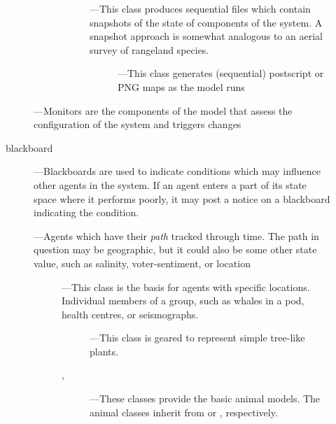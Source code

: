 \begin{description}
\begin{description}
\begin{description}
\begin{description}
      \item[]---This class produces sequential files
        which contain snapshots of the state of components of the
        system.  A snapshot approach is somewhat analogous to an
        aerial survey of rangeland species.
        
        \begin{description}
        \item[]---This class generates (sequential)
          postscript or PNG maps as the model runs
        \end{description}
      \end{description}
    \end{description}

  \item[\TTC{monitor}]---Monitors are the components of the
    model that assess the configuration of the system and
    triggers changes

  \item[blackboard]---Blackboards are used to indicate
    conditions which may influence other agents in the system.
    If an agent enters a part of its state space where it
    performs poorly, it may post a notice on a blackboard
    indicating the condition.

  \item[\TTC{tracked-agent}]---Agents which have their
    \emph{path} tracked through time.  The path in question may
    be geographic, but it could also be some other state
    value, such as salinity, voter-sentiment, or location

    \begin{description}
    \item[]---This class is the basis for agents with
      specific locations. Individual members of a group, such as
      whales in a pod, health centres, or seismographs.
      
      \begin{description}
      \item[]---This class is geared to
        represent simple tree-like plants.

      \item[, ]---These classes
        provide the basic animal models.  The animal classes
        inherit from  or ,
        respectively. 
      \end{description}



\end{description}
\end{description}
\end{description}
